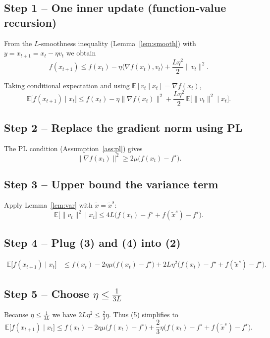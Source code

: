 \documentclass{article}
\begin{document}
\subsection*{Step 1 – One inner update (function‑value recursion)}
From the $L$‑smoothness inequality (Lemma~\ref{lem:smooth}) with
$y=x_{t+1}=x_t-\eta v_t$ we obtain
\[
f(x_{t+1})\le f(x_t)-\eta\langle\nabla f(x_t),v_t\rangle
            +\frac{L\eta^{2}}{2}\|v_t\|^{2}. \tag{1}
\]

Taking conditional expectation and using $\mathbb{E}[v_t\mid x_t]=\nabla f(x_t)$,
\[
\mathbb{E}\!\bigl[f(x_{t+1})\mid x_t\bigr]
\le f(x_t)-\eta\|\nabla f(x_t)\|^{2}
     +\frac{L\eta^{2}}{2}\,\mathbb{E}\!\bigl[\|v_t\|^{2}\mid x_t\bigr]. \tag{2}
\]

\subsection*{Step 2 – Replace the gradient norm using PL}
The PL condition (Assumption~\ref{ass:pl}) gives
\[
\|\nabla f(x_t)\|^{2}\ge 2\mu\bigl(f(x_t)-f^{\star}\bigr). \tag{3}
\]

\subsection*{Step 3 – Upper bound the variance term}
Apply Lemma~\ref{lem:var} with $\tilde{x}=\tilde{x}^{s}$:
\[
\mathbb{E}\!\bigl[\|v_t\|^{2}\mid x_t\bigr]
\le 4L\bigl(f(x_t)-f^{\star}+f(\tilde{x}^{s})-f^{\star}\bigr). \tag{4}
\]

\subsection*{Step 4 – Plug (3) and (4) into (2)}
\[
\begin{aligned}
\mathbb{E}\!\bigl[f(x_{t+1})\mid x_t\bigr]
&\le f(x_t)-2\eta\mu\bigl(f(x_t)-f^{\star}\bigr)
   +2L\eta^{2}\bigl(f(x_t)-f^{\star}+f(\tilde{x}^{s})-f^{\star}\bigr). \tag{5}
\end{aligned}
\]

\subsection*{Step 5 – Choose $\eta\le \frac{1}{3L}$}
Because $\eta\le\frac{1}{3L}$ we have $2L\eta^{2}\le\frac{2}{3}\eta$.
Thus (5) simplifies to
\[
\mathbb{E}\!\bigl[f(x_{t+1})\mid x_t\bigr]
\le f(x_t)-2\eta\mu\bigl(f(x_t)-f^{\star}\bigr)
   +\frac{2}{3}\eta\bigl(f(x_t)-f^{\star}+f(\tilde{x}^{s})-f^{\star}\bigr). \tag{6}
\]
\end{document}
